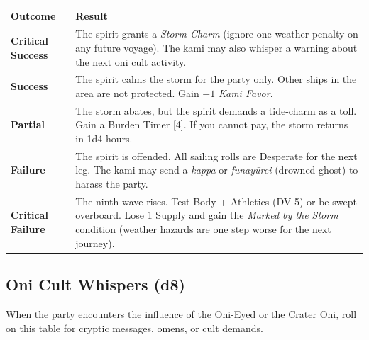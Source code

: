 \begin{longtable}{|p{2cm}|p{10cm}|}
\hline
\rowcolor{gray!20}
\textbf{Outcome} & \textbf{Result} \\
\hline
\textbf{Critical Success} & The spirit grants a \textit{Storm-Charm} (ignore one weather penalty on any future voyage). The kami may also whisper a warning about the next oni cult activity. \\
\hline
\textbf{Success} & The spirit calms the storm for the party only. Other ships in the area are not protected. Gain $+1$ \textit{Kami Favor}. \\
\hline
\textbf{Partial} & The storm abates, but the spirit demands a tide-charm as a toll. Gain a Burden Timer [4]. If you cannot pay, the storm returns in 1d4 hours. \\
\hline
\textbf{Failure} & The spirit is offended. All sailing rolls are Desperate for the next leg. The kami may send a \textit{kappa} or \textit{funay{\=u}rei} (drowned ghost) to harass the party. \\
\hline
\textbf{Critical Failure} & The ninth wave rises. Test Body + Athletics (DV 5) or be swept overboard. Lose 1 Supply and gain the \textit{Marked by the Storm} condition (weather hazards are one step worse for the next journey). \\
\hline
\end{longtable}

\subsection*{Oni Cult Whispers (d8)}
\label{sec:nihori-oni-whispers}

When the party encounters the influence of the Oni-Eyed or the Crater Oni, roll on this table for cryptic messages, omens, or cult demands.

